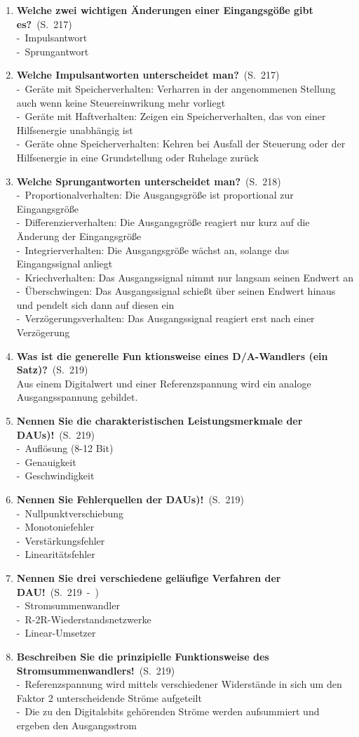 \documentclass[a4paper,12pt]{article}
\newcommand{\question}[3]{\pagebreak[3]\item {\textbf{#1?}}\ (S.\ #2)#3}
\newcommand{\statement}[3]{\pagebreak[3]\item {\textbf{#1!}}\ (S.\ #2)#3}
\newcommand{\catchword}[1]{\\-\ #1}
\newcommand{\normaltext}[1]{\\#1}
\newcommand{\page}[1]{#1}
\newcommand{\pages}[2]{#1\ -\ #2}
\begin{document}
\begin{enumerate}
  \question{Welche zwei wichtigen Änderungen einer Eingangsgöße gibt es}{\page{217}}
  {
    \catchword{Impulsantwort}
    \catchword{Sprungantwort}
  }

  \question{Welche Impulsantworten unterscheidet man}{\page{217}}
  {
    \catchword{Geräte mit Speicherverhalten: Verharren in der angenommenen Stellung
               auch wenn keine Steuereinwrikung mehr vorliegt}
    \catchword{Geräte mit Haftverhalten: Zeigen ein Speicherverhalten, das von einer
               Hilfsenergie unabhängig ist}
    \catchword{Geräte ohne Speicherverhalten: Kehren bei Ausfall der Steuerung oder der
               Hilfsenergie in eine Grundstellung oder Ruhelage zurück}
  }

  \question{Welche Sprungantworten unterscheidet man}{\page{218}}
  {
    \catchword{Proportionalverhalten: Die Ausgangsgröße ist proportional zur Eingangsgröße}
    \catchword{Differenzierverhalten: Die Ausgangsgröße reagiert nur kurz auf die Änderung
               der Eingangsgröße}
    \catchword{Integrierverhalten: Die Ausgangsgröße wächst an, solange das Eingangssignal
               anliegt}
    \catchword{Kriechverhalten: Das Ausgangssignal nimmt nur langsam seinen Endwert an}
    \catchword{Überschwingen: Das Ausgangssignal schießt über seinen Endwert hinaus und
               pendelt sich dann auf diesen ein}
    \catchword{Verzögerungsverhalten: Das Ausgangssignal reagiert erst nach einer Verzögerung}
  }

  \question{Was ist die generelle Fun ktionsweise eines D/A-Wandlers (ein Satz)}{\page{219}}
  {
    \normaltext{Aus einem Digitalwert und einer Referenzspannung wird ein analoge Ausgangsspannung gebildet.}
  }

  \statement{Nennen Sie die charakteristischen Leistungsmerkmale der DAUs)}{\page{219}}
  {
    \catchword{Auflösung (8-12 Bit)}
    \catchword{Genauigkeit}
    \catchword{Geschwindigkeit}
  }

  \statement{Nennen Sie Fehlerquellen der DAUs)}{\page{219}}
  {
    \catchword{Nullpunktverschiebung}
    \catchword{Monotoniefehler}
    \catchword{Verstärkungsfehler}
    \catchword{Linearitätsfehler}
  }

  \statement{Nennen Sie drei verschiedene geläufige Verfahren der DAU}{\pages{219}{}}
  {
    \catchword{Stromsummenwandler}
    \catchword{R-2R-Wiederstandsnetzwerke}
    \catchword{Linear-Umsetzer}
  }

  \statement{Beschreiben Sie die prinzipielle Funktionsweise des Stromsummenwandlers}{\page{219}}
  {
    \catchword{Referenzspannung wird mittels verschiedener Widerstände in sich um den Faktor 2
               unterscheidende Ströme aufgeteilt}
    \catchword{Die zu den Digitalsbits gehörenden Ströme werden aufsummiert und ergeben den Ausgangsstrom}
  }


\end{enumerate}
\end{document}
